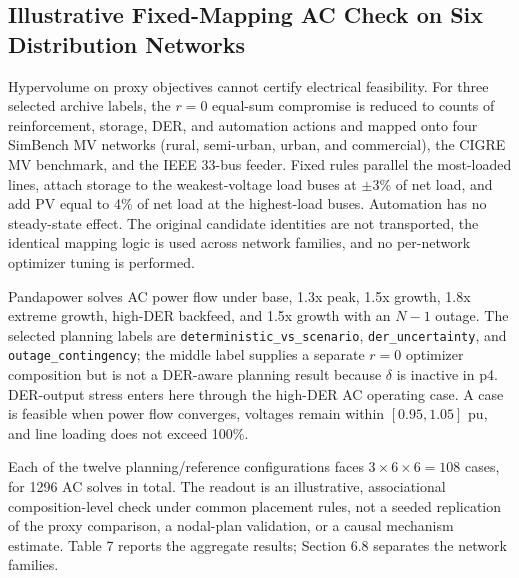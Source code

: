 \documentclass[energies,article,submit,moreauthors]{Definitions/mdpi}
\begin{document}
\subsection{Illustrative Fixed-Mapping AC Check on Six Distribution Networks}\label{illustrative-fixed-mapping-ac-check-on-six-distribution-networks}

Hypervolume on proxy objectives cannot certify electrical feasibility. For three selected archive labels, the \(r=0\) equal-sum compromise is reduced to counts of reinforcement, storage, DER, and automation actions and mapped onto four SimBench MV networks (rural, semi-urban, urban, and commercial), the CIGRE MV benchmark, and the IEEE 33-bus feeder. Fixed rules parallel the most-loaded lines, attach storage to the weakest-voltage load buses at $\pm$3\% of net load, and add PV equal to 4\% of net load at the highest-load buses. Automation has no steady-state effect. The original candidate identities are not transported, the identical mapping logic is used across network families, and no per-network optimizer tuning is performed.

Pandapower \cite{ref45} solves AC power flow under base, 1.3x peak, 1.5x growth, 1.8x extreme growth, high-DER backfeed, and 1.5x growth with an \(N-1\) outage. The selected planning labels are \texttt{deterministic\_vs\_scenario}, \texttt{der\_uncertainty}, and \texttt{outage\_contingency}; the middle label supplies a separate \(r=0\) optimizer composition but is not a DER-aware planning result because \(\delta\) is inactive in p4. DER-output stress enters here through the high-DER AC operating case. A case is feasible when power flow converges, voltages remain within \([0.95,1.05]\) pu, and line loading does not exceed 100\%.

Each of the twelve planning/reference configurations faces \(3\times6\times6=108\) cases, for 1296 AC solves in total. The readout is an illustrative, associational composition-level check under common placement rules, not a seeded replication of the proxy comparison, a nodal-plan validation, or a causal mechanism estimate. Table 7 reports the aggregate results; Section 6.8 separates the network families.
\end{document}
